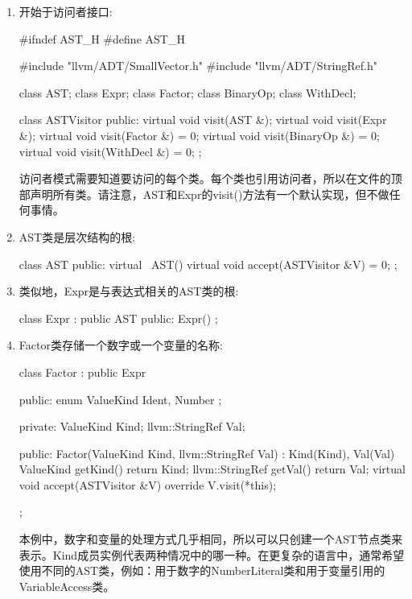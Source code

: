 \begin{enumerate}
\item
开始于访问者接口:

\begin{cpp}
#ifndef AST_H
#define AST_H

#include "llvm/ADT/SmallVector.h"
#include "llvm/ADT/StringRef.h"

class AST;
class Expr;
class Factor;
class BinaryOp;
class WithDecl;

class ASTVisitor {
    public:
    virtual void visit(AST &){};
    virtual void visit(Expr &){};
    virtual void visit(Factor &) = 0;
    virtual void visit(BinaryOp &) = 0;
    virtual void visit(WithDecl &) = 0;
};
\end{cpp}

访问者模式需要知道要访问的每个类。每个类也引用访问者，所以在文件的顶部声明所有类。请注意，AST和Expr的visit()方法有一个默认实现，但不做任何事情。

\item
AST类是层次结构的根:

\begin{cpp}
class AST {
public:
    virtual ~AST() {}
    virtual void accept(ASTVisitor &V) = 0;
};
\end{cpp}

\item
类似地，Expr是与表达式相关的AST类的根:

\begin{cpp}
class Expr : public AST {
public:
    Expr() {}
};
\end{cpp}

\item
Factor类存储一个数字或一个变量的名称:

\begin{cpp}
class Factor : public Expr {
public:
    enum ValueKind { Ident, Number };

private:
    ValueKind Kind;
    llvm::StringRef Val;

public:
    Factor(ValueKind Kind, llvm::StringRef Val)
        : Kind(Kind), Val(Val) {}
    ValueKind getKind() { return Kind; }
    llvm::StringRef getVal() { return Val; }
    virtual void accept(ASTVisitor &V) override {
        V.visit(*this);
    }
};
\end{cpp}

本例中，数字和变量的处理方式几乎相同，所以可以只创建一个AST节点类来表示。Kind成员实例代表两种情况中的哪一种。在更复杂的语言中，通常希望使用不同的AST类，例如：用于数字的NumberLiteral类和用于变量引用的VariableAccess类。


\end{enumerate}
